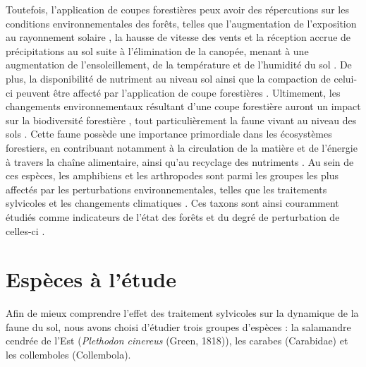 Toutefois, l'application de coupes forestières peux avoir des répercutions sur les conditions environnementales des forêts, 
telles que l'augmentation de l'exposition au rayonnement solaire , la hausse de vitesse des vents et la réception accrue de précipitations au sol suite à l'élimination de la canopée, 
menant à une augmentation de l'ensoleillement, de la température et de l'humidité du sol \citep{Keenan1993ecologicaleffects,Lindo2003Microbialbiomass,Heithecker2007Edgerelatedgradients}.
De plus, la disponibilité de nutriment au niveau sol ainsi que la compaction de celui-ci peuvent être affecté par l'application de coupe forestières \citep{Battigelli2004Shorttermimpact,Covington1981Changesforest,Lindo2003Microbialbiomass,rousseauLongtermEffectsBiomass2018}. 
Ultimement, les changements environnementaux résultant d'une coupe forestière auront un impact sur la biodiversité forestière \citep{Chaudhary2016Impactforest,Fedrowitz2014Canretention,Paillet2010Biodiversitydifferences}, 
tout particulièrement la faune vivant au niveau des sols \citep{Chaudhary2016Impactforest,Lindo2003Microbialbiomass,Kudrin2023metaanalysiseffects}.
Cette faune possède une importance primordiale dans les écosystèmes forestiers, en contribuant notamment à la circulation de la matière et de l'énergie à travers la chaîne alimentaire, ainsi qu'au recyclage des nutriments \citep{Kudrin2023metaanalysiseffects,Seibold2021contributioninsects}.
Au sein de ces espèces, les amphibiens et les arthropodes sont parmi les groupes les plus affectés par les perturbations environnementales, 
telles que les traitements sylvicoles \citep{Hartshorn2021reviewforest,Semlitsch2009Effectstimber,Stuart2004Statustrends} et les changements climatiques \citep{Alford1999Globalamphibian,Houlahan2000Quantitativeevidence,Milanovich2010Projectedloss,Parmesan2006EcologicalEvolutionary,Pounds2006Widespreadamphibian,Warren2018projectedeffect}. 
Ces taxons sont ainsi couramment étudiés comme indicateurs de l'état des forêts et du degré de perturbation de celles-ci \citep{birdChangesSoilLitter2004,Maleque2009Arthropodsbioindicators,pongeVerticalDistributionCollembola2000}.


\section*{Espèces à l'étude}
\label{sec:species}

Afin de mieux comprendre l'effet des traitement sylvicoles sur la dynamique de la faune du sol, nous avons choisi d'étudier trois groupes d'espèces : la salamandre cendrée de l'Est (\textit{Plethodon cinereus} (Green, 1818)), 
les carabes (Carabidae) et les collemboles (Collembola).

